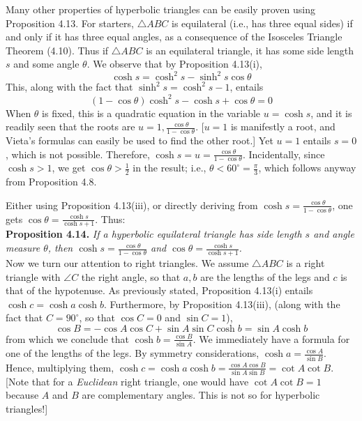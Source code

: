 \documentclass[leqno]{book}
\begin{document}
\noindent Many other properties of hyperbolic triangles can be easily proven using Proposition 4.13.  For starters, $\triangle ABC$ is equilateral (i.e., has three equal sides) if and only if it has three equal angles, as a consequence of the Isosceles Triangle Theorem (4.10).  Thus if $\triangle ABC$ is an equilateral triangle, it has some side length $s$ and some angle $\theta$.  We observe that by Proposition 4.13(i), %
$$\cosh s=\cosh^2s-\sinh^2s\cos\theta$$
This, along with the fact that $\sinh^2s=\cosh^2s-1$, entails 
$$(1-\cos\theta)\cosh^2s-\cosh s+\cos\theta=0$$
When $\theta$ is fixed, this is a quadratic equation in the variable $u=\cosh s$, and it is readily seen that the roots are $u=1,\frac{\cos\theta}{1-\cos\theta}$.  [$u=1$ is manifestly a root, and Vieta's formulas can easily be used to find the other root.]  Yet $u=1$ entails $s=0$, which is not possible.  Therefore, $\cosh s=u=\frac{\cos\theta}{1-\cos\theta}$.  Incidentally, since $\cosh s>1$, we get $\cos\theta>\frac 12$ in the result; i.e., $\theta<60^\circ=\frac{\pi}3$, which follows anyway from Proposition 4.8.

Either using Proposition 4.13(iii), or directly deriving from $\cosh s=\frac{\cos\theta}{1-\cos\theta}$, one gets $\cos\theta=\frac{\cosh s}{\cosh s+1}$.  Thus:\\

\noindent\textbf{Proposition 4.14.} \emph{If a hyperbolic equilateral triangle has side length $s$ and angle measure $\theta$, then $\cosh s=\frac{\cos\theta}{1-\cos\theta}$ and $\cos\theta=\frac{\cosh s}{\cosh s+1}$.}\\

\noindent Now we turn our attention to right triangles.  We assume $\triangle ABC$ is a right triangle with $\angle C$ the right angle, so that $a,b$ are the lengths of the legs and $c$ is that of the hypotenuse.  As previously stated, Proposition 4.13(i) entails $\cosh c=\cosh a\cosh b$.  Furthermore, by Proposition 4.13(iii), (along with the fact that $C=90^\circ$, so that $\cos C=0$ and $\sin C=1$),
$$\cos B=-\cos A\cos C+\sin A\sin C\cosh b=\sin A\cosh b$$
from which we conclude that $\cosh b=\frac{\cos B}{\sin A}$.  We immediately have a formula for one of the lengths of the legs.  By symmetry considerations, $\cosh a=\frac{\cos A}{\sin B}$.  Hence, multiplying them, $\cosh c=\cosh a\cosh b=\frac{\cos A\cos B}{\sin A\sin B}=\cot A\cot B$.  [Note that for a \emph{Euclidean} right triangle, one would have $\cot A\cot B=1$ because $A$ and $B$ are complementary angles.  This is not so for hyperbolic triangles!]
\end{document}
